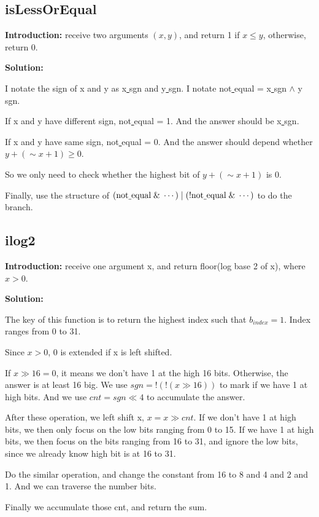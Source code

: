 \documentclass[12pt,a4paper]{article}
\theoremstyle{definition}
\numberwithin{equation}{section}
\numberwithin{figure}{section}
\begin{document}
\begin{spacing}{1.5}
\subsection{isLessOrEqual}
\textbf{Introduction: }receive two arguments $\left(x, y\right)$, and return 1 if $x \leq y$, otherwise, return 0.\par
\textbf{Solution: }\par
I notate the sign of x and y as x\underline{ }sgn and y\underline{ }sgn. I notate not\underline{ }equal = x\underline{ }sgn $\land$ y\underline{ }sgn.\par
If x and y have different sign, not\underline{ }equal = 1. And the answer should be x\underline{ }sgn.\par
If x and y have same sign, not\underline{ }equal = 0. And the answer should depend whether $y + \left(\sim x + 1\right) \geq 0$.\par
So we only need to check whether the highest bit of $y + \left(\sim x + 1\right)$ is 0.\par
Finally, use the structure of $\left(\textrm{not\underline{ }equal}\;\&\;\cdots\right) \mid \left(\textrm{!not\underline{ }equal}\;\&\;\cdots\right)$ to do the branch.\par

\subsection{ilog2}
\textbf{Introduction: }receive one argument x, and return floor(log base 2 of x), where $x > 0$.\par
\textbf{Solution: }\par
The key of this function is to return the highest index such that $b_{index} = 1$. Index ranges from 0 to 31.\par
Since $x > 0$, 0 is extended if x is left shifted.\par
If $x \gg 16 = 0$, it means we don't have 1 at the high 16 bits. Otherwise, the answer is at least 16 big. We use $sgn = !\left(!\left(x \gg 16\right)\right)$ to mark if we have 1 at high bits. And we use $cnt = sgn \ll 4$ to accumulate the answer.\par
After these operation, we left shift x, $x = x \gg cnt$. If we don't have 1 at high bits, we then only focus on the low bits ranging from 0 to 15. If we have  1 at high bits, we then focus on the bits ranging from 16 to 31, and ignore the low bits, since we already know high bit is at 16 to 31.\par
Do the similar operation, and change the constant from 16 to 8 and 4 and 2 and 1. And we can traverse the number bits.\par
Finally we accumulate those cnt, and return the sum.\par


\end{spacing}
\end{document}
